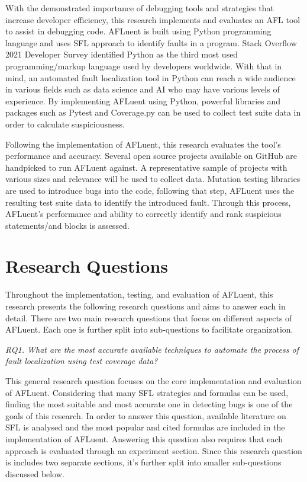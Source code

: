 With the demonstrated importance of debugging tools and strategies that increase
developer efficiency, this research implements and evaluates an AFL tool to
assist in debugging code. AFLuent is built using  Python programming
language and uses SFL approach to identify faults in a
program. Stack Overflow 2021 Developer Survey identified Python as the third
most used programming/markup language used by developers worldwide. With that in
mind, an automated fault localization tool in Python can reach a wide audience
in various fields such as data science and AI who may have various levels of
experience. By implementing AFLuent using Python, powerful libraries and
packages such as Pytest and Coverage.py can be used to collect test suite data
in order to calculate suspiciousness.

Following the implementation of AFLuent, this research evaluates the
tool's performance and accuracy. Several open source projects
available on GitHub are handpicked to run AFLuent against. A representative
sample of projects with various sizes and relevance will be used to collect
data. Mutation testing libraries are used to introduce bugs into the code,
following that step, AFLuent uses the resulting test suite data to identify the
introduced fault. Through this process, AFLuent's performance and ability to
correctly identify and rank suspicious statements/and blocks is assessed.

\section{Research Questions}
\label{sec:researchq}

Throughout the implementation, testing, and evaluation of AFLuent, this research
presents the following research questions and aims to answer each in detail.
There are two main research questions that focus on different aspects of
AFLuent. Each one is further split into sub-questions to facilitate organization.

\begin{center}
	\emph{RQ1. What are the most accurate available techniques to automate the process of
	fault localization using test coverage data?
	}
\end{center}

This general research question focuses on the core implementation and
evaluation of AFLuent. Considering that many SFL strategies and formulas can be
used, finding the most suitable and most accurate one in detecting bugs is one
of the goals of this research. In order to answer this question,
available literature on SFL is analysed and the most popular and cited formulas
are included in the implementation of AFLuent. Answering this question also
requires that each approach is evaluated through an experiment section.
Since this research question is includes two separate sections, it's further split into
smaller sub-questions discussed below.

